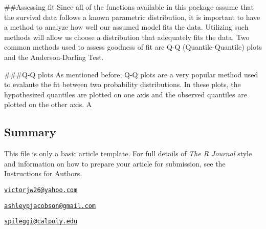 \#\#Assessing fit Since all of the functions available in this package
assume that the survival data follows a known parametric distribution,
it is important to have a method to analyze how well our assumed model
fits the data. Utilizing such methods will allow us choose a
distribution that adequately fits the data. Two common methods used to
assess goodness of fit are Q-Q (Quantile-Quantile) plots and the
Anderson-Darling Test.

\#\#\#Q-Q plots As mentioned before, Q-Q plots are a very popular method
used to evalaute the fit between two probability distributions. In these
plots, the hypothesized quantiles are plotted on one axis and the
observed quantiles are plotted on the other axis. A

\hypertarget{summary}{%
\subsection{Summary}\label{summary}}

This file is only a basic article template. For full details of
\emph{The R Journal} style and information on how to prepare your
article for submission, see the
\href{https://journal.r-project.org/share/author-guide.pdf}{Instructions
for Authors}.




\address{%
Victor Wilson\\
California Polytechnic State University, San Luis Obispo - Statistics
Department\\
\\
}
\href{mailto:victorjw26@yahoo.com}{\nolinkurl{victorjw26@yahoo.com}}

\address{%
Ashley Jacobson\\
California Polytechnic State University, San Luis Obispo - Statistics
Department\\
\\
}
\href{mailto:ashleypjacobson@gmail.com}{\nolinkurl{ashleypjacobson@gmail.com}}

\address{%
Shannon Pileggi\\
California Polytechnic State University, San Luis Obispo - Statistics
Department\\
\\
}
\href{mailto:spileggi@calpoly.edu}{\nolinkurl{spileggi@calpoly.edu}}

